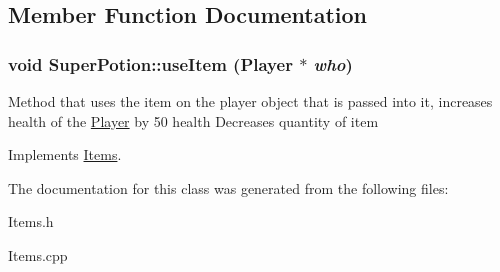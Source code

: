 \subsection{Member Function Documentation}
\hypertarget{classSuperPotion_aeffd98169f47e0b0e0cabd7cd4d25229}{
\subsubsection[{useItem}]{\setlength{\rightskip}{0pt plus 5cm}void SuperPotion::useItem ({\bf Player} $\ast$ {\em who})}}
\label{classSuperPotion_aeffd98169f47e0b0e0cabd7cd4d25229}
Method that uses the item on the player object that is passed into it, increases health of the \hyperlink{classPlayer}{Player} by 50 health Decreases quantity of item 

Implements \hyperlink{classItems}{Items}.

The documentation for this class was generated from the following files:\begin{DoxyCompactItemize}
\item 
Items.h\item 
Items.cpp\end{DoxyCompactItemize}

